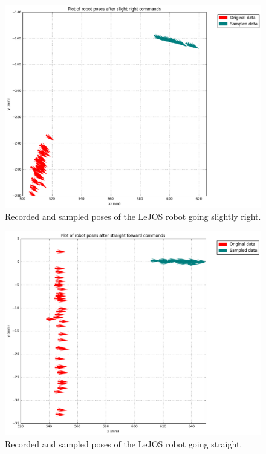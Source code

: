 \documentclass[paper=a4, fontsize=11pt]{scrartcl} %
\begin{document}
\begin{figure}[h!]
    \begin{center}
        \setlength{\fboxsep}{0.5pt} %
        \setlength{\fboxrule}{0.5pt}
        \includegraphics[width=13.5cm,fbox]{images/sampled_poses_slightRight.png}
        \caption{Recorded and sampled poses of the LeJOS robot going slightly right.}
    \end{center}
\end{figure}

\begin{figure}[h!]
    \begin{center}
        \setlength{\fboxsep}{0.5pt} %
        \setlength{\fboxrule}{0.5pt}
        \includegraphics[width=13.5cm,fbox]{images/sampled_poses_straight.png}
        \caption{Recorded and sampled poses of the LeJOS robot going straight.}
    \end{center}
\end{figure}
\end{document}

